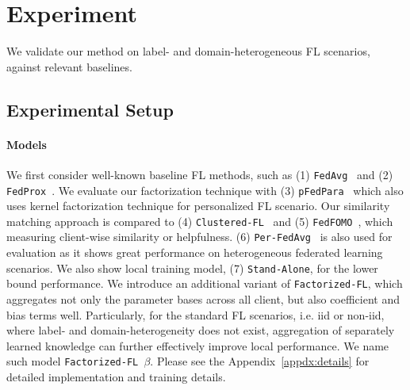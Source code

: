 
\section{Experiment}
\label{sec:exp}
We validate our method on label- and domain-heterogeneous FL scenarios, against relevant baselines.

\subsection{Experimental Setup}
\label{subsec:setup}

\paragraph{Models} We first consider well-known baseline FL methods, such as (1) \texttt{FedAvg}~\citep{McMahan2017CommunicationEfficientLO} and (2) \texttt{FedProx}~\citep{li2018federated}. We evaluate our factorization technique with (3) \texttt{pFedPara}~\citep{anonymous2022fedpara} which also uses kernel factorization technique for personalized FL scenario. Our similarity matching approach is compared to (4) \texttt{Clustered-FL}~\citep{sattler2019clustered} and (5) \texttt{FedFOMO}~\citep{zhang2021personalized}, which measuring client-wise similarity or helpfulness. (6) \texttt{Per-FedAvg}~\citep{fallah2020personalized} is also used for evaluation as it shows great performance on heterogeneous federated learning scenarios. We also show local training model, (7) \texttt{Stand-Alone}, for the lower bound performance. We introduce an additional variant of \texttt{Factorized-FL}, which aggregates not only the parameter bases across all client, but also coefficient and bias terms well. Particularly, for the standard FL scenarios, i.e. iid or non-iid, where label- and domain-heterogeneity does not exist, aggregation of separately learned knowledge can further effectively improve local performance. We name such model \texttt{Factorized-FL $\beta$}. Please see the Appendix~\ref{appdx:details} for detailed implementation and training details. 


\vspace{-0.1in}
